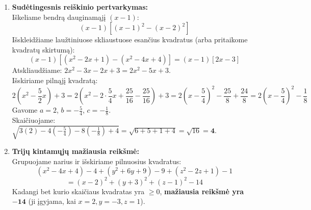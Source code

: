 \documentclass[12pt,a4paper]{article}
\begin{document}
\begin{enumerate}
    \vspace{0.3cm}
    \item \textbf{Sudėtingesnis reiškinio pertvarkymas:} \\
    Iškeliame bendrą dauginamąjį $(x-1)$:
    $$ (x-1)\left[ (x-1)^2 - (x-2)^2 \right] $$
    Išskleidžiame laužtiniuose skliaustuose esančius kvadratus (arba pritaikome kvadratų skirtumą):
    $$ (x-1) [ (x^2 - 2x + 1) - (x^2 - 4x + 4) ] = (x-1)[ 2x - 3 ] $$
    Atskliaudžiame: $2x^2 - 3x - 2x + 3 = 2x^2 - 5x + 3$. \\
    Išskiriame pilnąjį kvadratą:
    $$ 2\left(x^2 - \frac{5}{2}x\right) + 3 = 2\left(x^2 - 2 \cdot \frac{5}{4}x + \frac{25}{16} - \frac{25}{16}\right) + 3 = 2\left(x - \frac{5}{4}\right)^2 - \frac{25}{8} + \frac{24}{8} = 2\left(x - \frac{5}{4}\right)^2 - \frac{1}{8} $$
    Gavome $a = 2$, $b = -\frac{5}{4}$, $c = -\frac{1}{8}$. \\
    Skaičiuojame: $\sqrt{3(2) - 4(-\frac{5}{4}) - 8(-\frac{1}{8})+4} = \sqrt{6 + 5 + 1 + 4} = \sqrt{16} = \mathbf{4}$.

    \vspace{0.3cm}
    \item \textbf{Trijų kintamųjų mažiausia reikšmė:} \\
    Grupuojame narius ir išskiriame pilnuosius kvadratus:
    $$ (x^2 - 4x + 4) - 4 + (y^2 + 6y + 9) - 9 + (z^2 - 2z + 1) - 1 $$
    $$ = (x-2)^2 + (y+3)^2 + (z-1)^2 - 14 $$
    Kadangi bet kurio skaičiaus kvadratas yra $\ge 0$, \textbf{mažiausia reikšmė yra $\mathbf{-14}$} (ji įgyjama, kai $x=2, y=-3, z=1$).

\end{enumerate}
\end{document}
